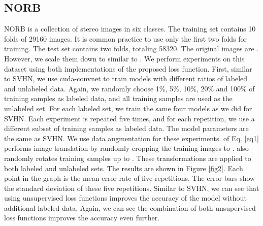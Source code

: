 \documentclass{article}
\begin{document}
\subsection{NORB}
\vspace{-0.1cm}
NORB is a collection of stereo images in six classes. The training set contains 10 folds of 29160 images. It is common practice to use only the first two folds for training. The test set contains two folds, totaling 58320. The original images are . However, we scale them down to  similar to \cite{ciresan2012multi}. We perform experiments on this dataset using both implementations of the proposed loss function. First, similar to SVHN, we use cuda-convnet to train models with different ratios of labeled and unlabeled data. Again, we randomly choose 1\%, 5\%, 10\%, 20\% and 100\% of training samples as labeled data, and all training samples are used as the unlabeled set. For each labeled set, we train the same four models as we did for SVHN. Each experiment is repeated five times, and for each repetition, we use a different subset of training samples as labeled data. The model parameters are the same as SVHN. We use data augmentation for these experiments.  of Eq. \ref{eq1} performs image translation by randomly cropping the training images to .  also randomly rotates training samples up to . These transformations are applied to both labeled and unlabeled sets. The results are shown in Figure \ref{fig2}. Each point in the graph is the mean error rate of five repetitions. The error bars show the standard deviation of these five repetitions. Similar to SVHN, we can see that using unsupervised loss functions improves the accuracy of the model without additional labeled data. Again, we can see the combination of both unsupervised loss functions improves the accuracy even further.
\end{document}
